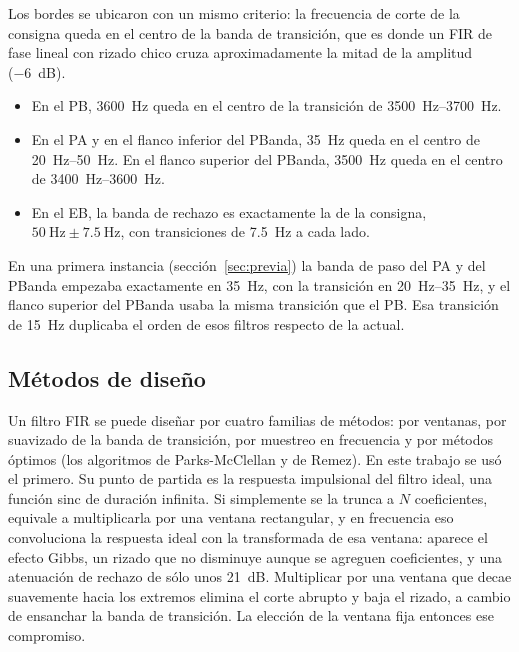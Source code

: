 \documentclass[11pt,a4paper]{article}
\begin{document}
Los bordes se ubicaron con un mismo criterio: la frecuencia de corte de la
consigna queda en el centro de la banda de transición, que es donde un FIR
de fase lineal con rizado chico cruza aproximadamente la mitad de la
amplitud (\qty{-6}{\deci\bel}).
\begin{itemize}[nosep]
  \item En el PB, \qty{3600}{\hertz} queda en el centro de la transición de
        \qtyrange{3500}{3700}{\hertz}.
  \item En el PA y en el flanco inferior del PBanda, \qty{35}{\hertz} queda
        en el centro de \qtyrange{20}{50}{\hertz}. En el flanco superior del
        PBanda, \qty{3500}{\hertz} queda en el centro de
        \qtyrange{3400}{3600}{\hertz}.
  \item En el EB, la banda de rechazo es exactamente la de la consigna,
        $\qty{50}{\hertz} \pm \qty{7.5}{\hertz}$, con transiciones de
        \qty{7.5}{\hertz} a cada lado.
\end{itemize}
En una primera instancia (sección~\ref{sec:previa}) la banda de paso del
PA y del PBanda empezaba exactamente en \qty{35}{\hertz}, con la transición
en \qtyrange{20}{35}{\hertz}, y el flanco superior del PBanda usaba la misma
transición que el PB. Esa transición de \qty{15}{\hertz} duplicaba el orden
de esos filtros respecto de la actual.

\subsection{Métodos de diseño}\label{sec:metodos}

Un filtro FIR se puede diseñar por cuatro familias de métodos: por ventanas, por
suavizado de la banda de transición, por muestreo en frecuencia y por métodos
óptimos (los algoritmos de Parks-McClellan y de Remez). En este trabajo se usó
el primero. Su punto de partida es la respuesta impulsional del filtro ideal,
una función sinc de duración infinita. Si simplemente se la trunca a $N$
coeficientes, equivale a multiplicarla por una ventana rectangular, y en
frecuencia eso convoluciona la respuesta ideal con la transformada de esa
ventana: aparece el efecto Gibbs, un rizado que no disminuye aunque se agreguen
coeficientes, y una atenuación de rechazo de sólo unos
\qty{21}{\deci\bel}. Multiplicar por una ventana que decae suavemente hacia los
extremos elimina el corte abrupto y baja el rizado, a cambio de ensanchar la
banda de transición. La elección de la ventana fija entonces ese compromiso.
\end{document}
